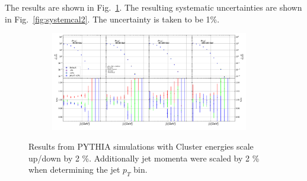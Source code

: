 The results are shown in Fig.~\ref{fig:systemcal}. The resulting systematic uncertainties are shown in Fig.~\ref{fig:systemcal2}. The uncertainty is taken to be 1\%. 

\begin{figure}
\centering
\begin{subfigure}{0.90\textwidth}
\includegraphics[width=0.95\textwidth]{figures/systematics/HadCorrComparisonJetPt4To8.pdf}
\end{subfigure}
\caption{Results from PYTHIA simulations with Cluster energies scale up/down by 2 \%. Additionally jet momenta were scaled by 2 \% when determining the jet $p_T$ bin.}
\label{fig:systemcal}
\end{figure}

